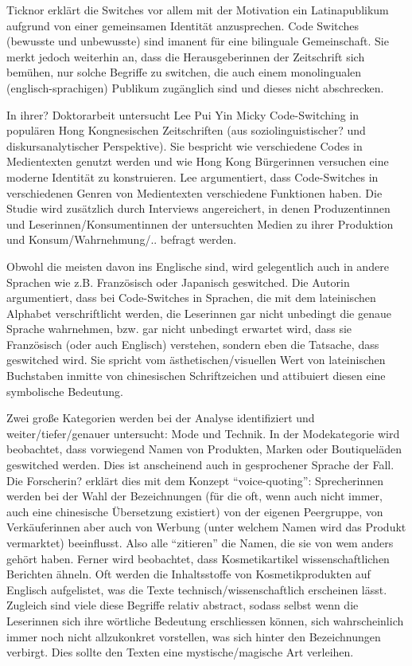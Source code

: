 Ticknor erklärt die Switches vor allem mit der Motivation ein Latinapublikum aufgrund von einer gemeinsamen Identität anzusprechen.
Code Switches (bewusste und unbewusste) sind imanent für eine bilinguale Gemeinschaft.
Sie merkt jedoch weiterhin an, dass die Herausgeberinnen der Zeitschrift sich bemühen, nur solche Begriffe zu switchen, die auch einem monolingualen (englisch-sprachigen) Publikum zugänglich sind und dieses nicht abschrecken.



In ihrer? Doktorarbeit untersucht Lee Pui Yin Micky Code-Switching in populären Hong Kongnesischen Zeitschriften (aus soziolinguistischer? und diskursanalytischer Perspektive).
Sie bespricht wie verschiedene Codes in Medientexten genutzt werden und wie Hong Kong Bürgerinnen versuchen eine moderne Identität zu konstruieren.
Lee argumentiert, dass Code-Switches in verschiedenen Genren von Medientexten verschiedene Funktionen haben.
Die Studie wird zusätzlich durch Interviews angereichert, in denen Produzentinnen und Leserinnen/Konsumentinnen der untersuchten Medien zu ihrer Produktion und Konsum/Wahrnehmung/.. befragt werden.

Obwohl die meisten davon ins Englische sind, wird gelegentlich auch in andere Sprachen wie z.B. Französisch oder Japanisch geswitched.
Die Autorin argumentiert, dass bei Code-Switches in Sprachen, die mit dem lateinischen Alphabet verschriftlicht werden, die Leserinnen gar nicht unbedingt die genaue Sprache wahrnehmen, bzw. gar nicht unbedingt erwartet wird, dass sie Französisch (oder auch Englisch) verstehen, sondern eben die Tatsache, dass geswitched wird.
Sie spricht vom ästhetischen/visuellen Wert von lateinischen Buchstaben inmitte von chinesischen Schriftzeichen und attibuiert diesen eine symbolische Bedeutung.

Zwei große Kategorien werden bei der Analyse identifiziert und weiter/tiefer/genauer untersucht: Mode und Technik.
In der Modekategorie wird beobachtet, dass vorwiegend Namen von Produkten, Marken oder Boutiqueläden geswitched werden.
Dies ist anscheinend auch in gesprochener Sprache der Fall.
Die Forscherin? erklärt dies mit dem Konzept ``voice-quoting'': Sprecherinnen werden bei der Wahl der Bezeichnungen (für die oft, wenn auch nicht immer, auch eine chinesische Übersetzung existiert) von der eigenen Peergruppe, von Verkäuferinnen aber auch von Werbung (unter welchem Namen wird das Produkt vermarktet) beeinflusst.
Also alle ``zitieren'' die Namen, die sie von wem anders gehört haben.
Ferner wird beobachtet, dass Kosmetikartikel wissenschaftlichen Berichten ähneln.
Oft werden die Inhaltsstoffe von Kosmetikprodukten auf Englisch aufgelistet, was die Texte technisch/wissenschaftlich erscheinen lässt.
Zugleich sind viele diese Begriffe relativ abstract, sodass selbst wenn die Leserinnen sich ihre wörtliche Bedeutung erschliessen können, sich wahrscheinlich immer noch nicht allzukonkret vorstellen, was sich hinter den Bezeichnungen verbirgt.
Dies sollte den Texten eine mystische/magische Art verleihen.

